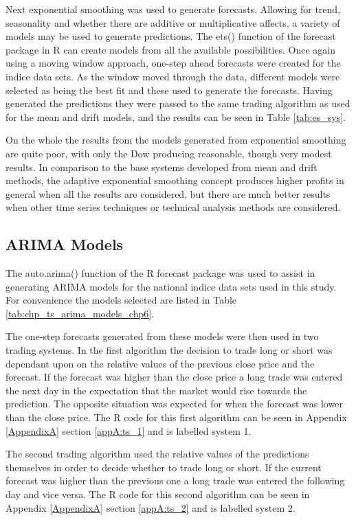 Next exponential smoothing was used to  generate forecasts. Allowing for trend, seasonality and whether there are additive or multiplicative affects, a variety of models may be used to generate predictions. The ets() function of the forecast package in R can create models from all the available possibilities. Once again using a moving window approach, one-step ahead forecasts were created for the indice data sets. As the window moved through the data, different models were selected as being the best fit and these used to generate the forecasts. Having generated the predictions they were passed to the same trading algorithm as used for the mean and drift models, and the results can be seen in Table \ref{tab:es_sys}. 

On the whole the results from the models generated from exponential smoothing are quite poor, with only the Dow producing reasonable, though very modest results. In comparison to the base systems developed from mean and drift methods, the adaptive exponential smoothing concept produces higher profits in general when all the results are considered, but there are much better results when other time series techniques or technical analysis methods are considered.

\subsection{ARIMA Models}
The auto.arima() function of the R forecast package was used to assist in generating ARIMA models for the national indice data sets used in this study. For convenience the models selected are listed in Table \ref{tab:chp_ts_arima_models_chp6}.



The one-step forecasts generated from these models were then used in two trading systems. In the first algorithm the decision to trade long or short was dependant upon on the relative values of the previous close price and the forecast. If the forecast was higher than the close price a long trade was entered the next day in the expectation that the market would rise towards the prediction. The opposite situation was expected for when the forecast was lower than the close price. The R code for this first algorithm can be seen in Appendix \ref{AppendixA} section \ref{appA:ts_1} and is labelled system 1.

The second trading algorithm used the relative values of the predictions themselves in order to decide whether to trade long or short. If the current forecast was higher than the previous one a long trade was entered the following day and vice versa.  The R code for this second algorithm can be seen in Appendix \ref{AppendixA} section \ref{appA:ts_2} and is labelled system 2.

